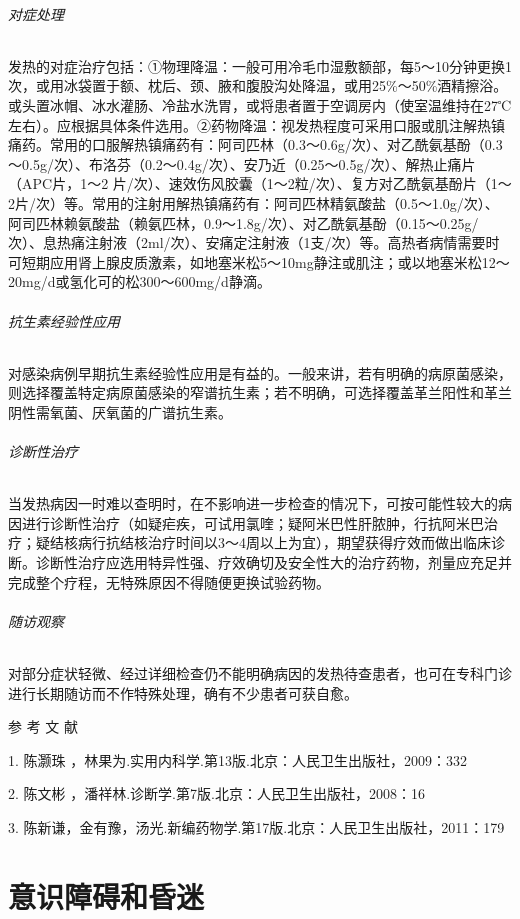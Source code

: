 \subparagraph{对症处理}

发热的对症治疗包括：①物理降温：一般可用冷毛巾湿敷额部，每5～10分钟更换1次，或用冰袋置于额、枕后、颈、腋和腹股沟处降温，或用25\%～50\%酒精擦浴。或头置冰帽、冰水灌肠、冷盐水洗胃，或将患者置于空调房内（使室温维持在27℃左右）。应根据具体条件选用。②药物降温：视发热程度可采用口服或肌注解热镇痛药。常用的口服解热镇痛药有：阿司匹林（0.3～0.6g/次）、对乙酰氨基酚（0.3～0.5g/次）、布洛芬（0.2～0.4g/次）、安乃近（0.25～0.5g/次）、解热止痛片（APC片，1～2
片/次）、速效伤风胶囊（1～2粒/次）、复方对乙酰氨基酚片（1～2片/次）等。常用的注射用解热镇痛药有：阿司匹林精氨酸盐（0.5～1.0g/次）、阿司匹林赖氨酸盐（赖氨匹林，0.9～1.8g/次）、对乙酰氨基酚（0.15～0.25g/次）、息热痛注射液（2ml/次）、安痛定注射液（1支/次）等。高热者病情需要时可短期应用肾上腺皮质激素，如地塞米松5～10mg静注或肌注；或以地塞米松12～20mg/d或氢化可的松300～600mg/d静滴。

\subparagraph{抗生素经验性应用}

对感染病例早期抗生素经验性应用是有益的。一般来讲，若有明确的病原菌感染，则选择覆盖特定病原菌感染的窄谱抗生素；若不明确，可选择覆盖革兰阳性和革兰阴性需氧菌、厌氧菌的广谱抗生素。

\subparagraph{诊断性治疗}

当发热病因一时难以查明时，在不影响进一步检查的情况下，可按可能性较大的病因进行诊断性治疗（如疑疟疾，可试用氯喹；疑阿米巴性肝脓肿，行抗阿米巴治疗；疑结核病行抗结核治疗时间以3～4周以上为宜），期望获得疗效而做出临床诊断。诊断性治疗应选用特异性强、疗效确切及安全性大的治疗药物，剂量应充足并完成整个疗程，无特殊原因不得随便更换试验药物。

\subparagraph{随访观察}

对部分症状轻微、经过详细检查仍不能明确病因的发热待查患者，也可在专科门诊进行长期随访而不作特殊处理，确有不少患者可获自愈。

\protect\hypertarget{text00009.html}{}{}

\hypertarget{text00009.htmlux5cux23CHP1-1-4}{}
参 考 文 献

1. 陈灏珠 ，林果为.实用内科学.第13版.北京：人民卫生出版社，2009：332

2. 陈文彬 ，潘祥林.诊断学.第7版.北京：人民卫生出版社，2008：16

3.
陈新谦，金有豫，汤光.新编药物学.第17版.北京：人民卫生出版社，2011：179

\protect\hypertarget{text00010.html}{}{}

\chapter{意识障碍和昏迷}

